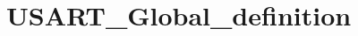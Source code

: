 \hypertarget{group___u_s_a_r_t___global__definition}{\section{U\-S\-A\-R\-T\-\_\-\-Global\-\_\-definition}
\label{group___u_s_a_r_t___global__definition}
}
